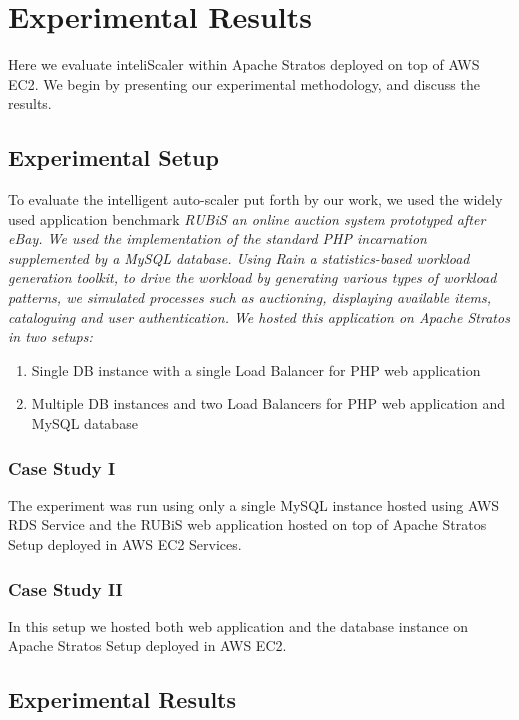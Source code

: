 \section{Experimental Results}
Here we evaluate inteliScaler within Apache Stratos deployed on top of AWS EC2. We begin by presenting our experimental methodology, and discuss the results. \\

\subsection{Experimental Setup}
To evaluate the intelligent auto-scaler put forth by our work, we used the widely used application benchmark \em{RUBiS} an online auction system prototyped after eBay. We used the implementation of the standard PHP incarnation supplemented by a MySQL database. Using \em{Rain} a statistics-based workload generation toolkit, to drive the workload by generating various types of workload patterns, we simulated processes such as auctioning, displaying available items, cataloguing and user authentication. We hosted this application on Apache Stratos in two setups:\\

\begin{enumerate}
\item Single DB instance with a single Load Balancer for PHP web application

\item Multiple DB instances and two Load Balancers for PHP web application and MySQL database

\end{enumerate}

\subsubsection{Case Study I}
The experiment was run using only a single MySQL instance hosted using AWS RDS Service and the RUBiS web application hosted on top of Apache Stratos Setup deployed in AWS EC2 Services. \\

\subsubsection{Case Study II}
In this setup we hosted both web application and the database instance on Apache Stratos Setup deployed in AWS EC2.

\subsection{Experimental Results}
